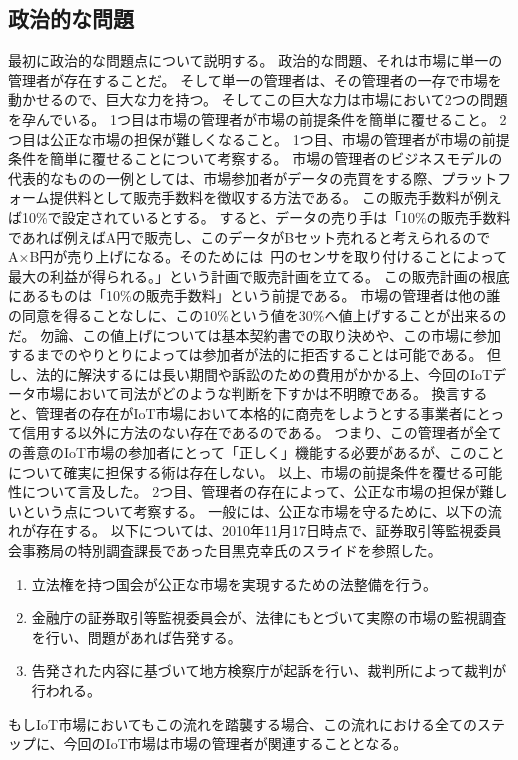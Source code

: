 \subsection{政治的な問題}
最初に政治的な問題点について説明する。
政治的な問題、それは市場に単一の管理者が存在することだ。
そして単一の管理者は、その管理者の一存で市場を動かせるので、巨大な力を持つ。
そしてこの巨大な力は市場において2つの問題を孕んでいる。
1つ目は市場の管理者が市場の前提条件を簡単に覆せること。
2つ目は公正な市場の担保が難しくなること。
1つ目、市場の管理者が市場の前提条件を簡単に覆せることについて考察する。
市場の管理者のビジネスモデルの代表的なものの一例としては、市場参加者がデータの売買をする際、プラットフォーム提供料として販売手数料を徴収する方法である。
この販売手数料が例えば10\%で設定されているとする。
すると、データの売り手は「10\%の販売手数料であれば例えばA円で販売し、このデータがBセット売れると考えられるのでA×B円が売り上げになる。そのためには~円のセンサを取り付けることによって最大の利益が得られる。」という計画で販売計画を立てる。
この販売計画の根底にあるものは「10\%の販売手数料」という前提である。
市場の管理者は他の誰の同意を得ることなしに、この10\%という値を30\%へ値上げすることが出来るのだ。
勿論、この値上げについては基本契約書での取り決めや、この市場に参加するまでのやりとりによっては参加者が法的に拒否することは可能である。
但し、法的に解決するには長い期間や訴訟のための費用がかかる上、今回のIoTデータ市場において司法がどのような判断を下すかは不明瞭である。
換言すると、管理者の存在がIoT市場において本格的に商売をしようとする事業者にとって信用する以外に方法のない存在であるのである。
つまり、この管理者が全ての善意のIoT市場の参加者にとって「正しく」機能する必要があるが、このことについて確実に担保する術は存在しない。
以上、市場の前提条件を覆せる可能性について言及した。
2つ目、管理者の存在によって、公正な市場の担保が難しいという点について考察する。
一般には、公正な市場を守るために、以下の流れが存在する。
以下については、2010年11月17日時点で、証券取引等監視委員会事務局の特別調査課長であった目黒克幸氏のスライド\cite{kousei_torihiki}を参照した。
\begin{enumerate}
\item 立法権を持つ国会が公正な市場を実現するための法整備を行う。
\item 金融庁の証券取引等監視委員会が、法律にもとづいて実際の市場の監視調査を行い、問題があれば告発する。
\item 告発された内容に基づいて地方検察庁が起訴を行い、裁判所によって裁判が行われる。
\end{enumerate}
もしIoT市場においてもこの流れを踏襲する場合、この流れにおける全てのステップに、今回のIoT市場は市場の管理者が関連することとなる。
